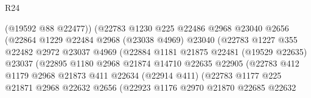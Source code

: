 \begin{lexlean}{R24}
\begin{coremodule}
                                  (@19592 @88 @22477))
                                (@22783
                                  @1230
                                  @225
                                  @22486
                                  @2968
                                  @23040
                                  @2656
                                  (@22864
                                    @1229
                                    @22484
                                    @2968
                                    (@23038 @4969)
                                    @23040
                                    (@22783
                                      @1227
                                      @355
                                      @22482
                                      @2972
                                      @23037
                                      @4969
                                      (@22884
                                        @1181
                                        @21875
                                        @22481
                                        (@19529 @22635)
                                        @23037
                                        (@22895
                                          @1180
                                          @2968
                                          @21874
                                          @14710
                                          @22635
                                          @22905
                                          (@22783
                                            @412
                                            @1179
                                            @2968
                                            @21873
                                            @411
                                            @22634
                                            (@22914 @411)
                                            (@22783
                                              @1177
                                              @225
                                              @21871
                                              @2968
                                              @22632
                                              @2656
                                              (@22923
                                                @1176
                                                @2970
                                                @21870
                                                @22685
                                                @22632

\end{coremodule}
\end{lexlean}
